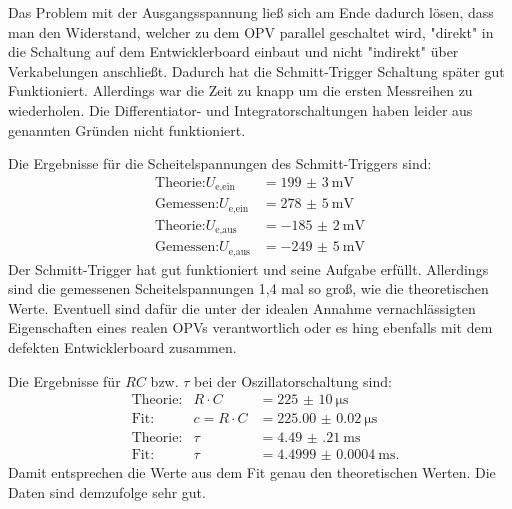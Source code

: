 \documentclass[
  bibliography=totoc,     %
  captions=tableheading,  %
  titlepage=firstiscover, %
]{scrartcl}
\begin{document}
\noindent
Das Problem mit der Ausgangsspannung ließ sich am Ende dadurch lösen,
dass man den Widerstand, welcher zu dem OPV parallel geschaltet wird, "direkt"
in die Schaltung auf dem Entwicklerboard einbaut und nicht "indirekt"
über Verkabelungen anschließt. Dadurch hat die Schmitt-Trigger Schaltung später
gut Funktioniert. Allerdings war die Zeit zu knapp um die ersten Messreihen zu
wiederholen. Die Differentiator- und Integratorschaltungen haben leider aus genannten
Gründen nicht funktioniert.

\noindent
Die Ergebnisse für die Scheitelspannungen des Schmitt-Triggers sind:
\begin{align*}
  \text{Theorie:} U_\text{e,ein} &= \SI{199(3)}{\milli\volt} \\
  \text{Gemessen:} U_\text{e,ein} &= \SI{278(5)}{\milli\volt} \\
  \text{Theorie:} U_\text{e,aus} &= \SI{-185(2)}{\milli\volt} \\
  \text{Gemessen:} U_\text{e,aus} &= \SI{-249(5)}{\milli\volt}
\end{align*}
Der Schmitt-Trigger hat gut funktioniert und seine Aufgabe erfüllt.
Allerdings sind die gemessenen Scheitelspannungen 1,4 mal
so groß, wie die theoretischen Werte.
Eventuell sind dafür die unter der idealen Annahme vernachlässigten Eigenschaften
eines realen OPVs verantwortlich oder es hing ebenfalls mit dem defekten Entwicklerboard
zusammen.

\noindent
Die Ergebnisse für $RC$ bzw. $\tau$ bei der Oszillatorschaltung sind:
\begin{align*}
  &\text{Theorie:}& R \cdot C &= \SI{225(10)}{\micro\second} \\
  &\text{Fit:}& c = R \cdot C &= \SI{225.00(2)}{\micro\second} \\
  &\text{Theorie:}& \tau &= \SI{4.49(21)}{\milli\second} \\
  &\text{Fit:}& \tau &= \SI{4.4999(4)}{\milli\second}.
\end{align*}
Damit entsprechen die Werte aus dem Fit genau den theoretischen Werten.
Die Daten sind demzufolge sehr gut.

\newpage
\nocite{*}
\printbibliography
\end{document}
